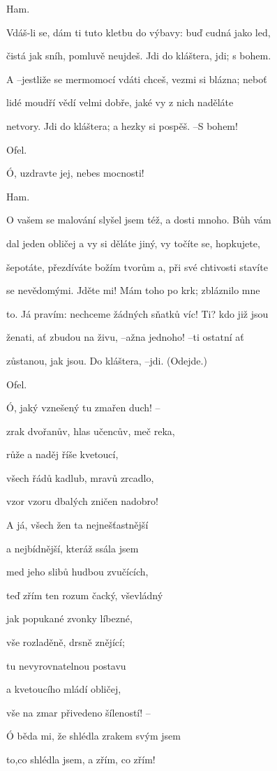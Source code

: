 \documentclass[11pt]{article}
\begin{document}
\begin{multicols}{2}
    Ham.

    Vdáš-li se, dám ti tuto kletbu do výbavy: buď cudná jako led,

    čistá jak sníh, pomluvě neujdeš. Jdi do kláštera, jdi; s bohem.

    A –jestliže se mermomocí vdáti chceš, vezmi si blázna; neboť

    lidé moudří vědí velmi dobře, jaké vy z nich naděláte

    netvory. Jdi do kláštera; a hezky si pospěš. –S bohem!

    Ofel.

    Ó, uzdravte jej, nebes mocnosti!

    Ham.

    O vašem se malování slyšel jsem též, a dosti mnoho. Bůh vám

    dal jeden obličej a vy si děláte jiný, vy točíte se, hopkujete,

    šepotáte, přezdíváte božím tvorům a, při své chtivosti stavíte

    se nevědomými. Jděte mi! Mám toho po krk; zbláznilo mne

    to. Já pravím: nechceme žádných sňatků víc! Ti? kdo již jsou

    ženati, ať zbudou na živu, –ažna jednoho! –ti ostatní ať

    zůstanou, jak jsou. Do kláštera, –jdi. (Odejde.)

    Ofel.

    Ó, jaký vznešený tu zmařen duch! –

    zrak dvořanův, hlas učencův, meč reka,

    růže a naděj říše kvetoucí,

    všech řádů kadlub, mravů zrcadlo,

    vzor vzoru dbalých zničen nadobro!

    A já, všech žen ta nejnešťastnější

    a nejbídnější, kteráž ssála jsem

    med jeho slibů hudbou zvučících,

    teď zřím ten rozum čacký, vševládný

    jak popukané zvonky líbezné,

    vše rozladěně, drsně znějící;

    tu nevyrovnatelnou postavu

    a kvetoucího mládí obličej,

    vše na zmar přivedeno šíleností! –

    Ó běda mi, že shlédla zrakem svým jsem

    to,co shlédla jsem, a zřím, co zřím!
    \end{multicols}
\end{document}
